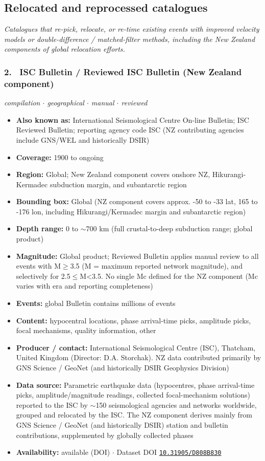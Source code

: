 \documentclass[10pt,a4paper]{article}
\newcommand{\kv}[2]{\item \textbf{#1:} #2}
\begin{document}
\subsection{Relocated and reprocessed catalogues}
\textit{Catalogues that re-pick, relocate, or re-time existing events with improved velocity models or double-difference / matched-filter methods, including the New Zealand components of global relocation efforts.}\par\vspace{4pt}
\subsubsection*{\hypertarget{c:2}{2.}~ ISC Bulletin / Reviewed ISC Bulletin (New Zealand component)}
{\small\itshape compilation $\cdot$ geographical $\cdot$ manual $\cdot$ reviewed}\par\vspace{2pt}
\begin{itemize}[leftmargin=1.3em,itemsep=0.6pt,topsep=1pt,parsep=0pt]
\kv{Also known as}{International Seismological Centre On-line Bulletin; ISC Reviewed Bulletin; reporting agency code ISC (NZ contributing agencies include GNS/WEL and historically DSIR)}
\kv{Coverage}{1900 to ongoing}
\kv{Region}{Global; New Zealand component covers onshore NZ, Hikurangi-Kermadec subduction margin, and subantarctic region}
\kv{Bounding box}{Global (NZ component covers approx. -50 to -33 lat, 165 to -176 lon, including Hikurangi/Kermadec margin and subantarctic region)}
\kv{Depth range}{0 to $\sim$700 km (full crustal-to-deep subduction range; global product)}
\kv{Magnitude}{Global product; Reviewed Bulletin applies manual review to all events with M$\geq$3.5 (M = maximum reported network magnitude), and selectively for 2.5$\leq$M\textless{}3.5. No single Mc defined for the NZ component (Mc varies with era and reporting completeness)}
\kv{Events}{global Bulletin contains millions of events}
\kv{Content}{hypocentral locations, phase arrival-time picks, amplitude picks, focal mechanisms, quality information, other}
\kv{Producer / contact}{International Seismological Centre (ISC), Thatcham, United Kingdom (Director: D.A. Storchak). NZ data contributed primarily by GNS Science / GeoNet (and historically DSIR Geophysics Division)}
\kv{Data source}{Parametric earthquake data (hypocentres, phase arrival-time picks, amplitude/magnitude readings, collected focal-mechanism solutions) reported to the ISC by $\sim$150 seismological agencies and networks worldwide, grouped and relocated by the ISC. The NZ component derives mainly from GNS Science / GeoNet (and historically DSIR) station and bulletin contributions, supplemented by globally collected phases}
\kv{Availability}{available (DOI) $\cdot$ Dataset DOI \href{https://doi.org/10.31905/D808B830}{\nolinkurl{10.31905/D808B830}}}
\end{itemize}
\end{document}
